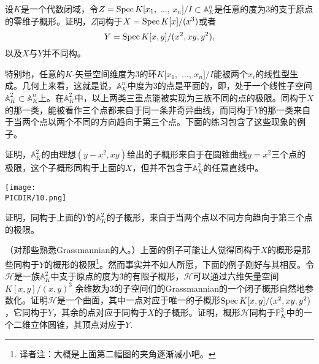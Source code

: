 \begin{exe}
	设$K$是一个代数闭域，令$Z=\operatorname{Spec} K[x_1,$ $\dots$, $x_n]/I\subset \mathbb{A}_K^n$是任意的度为3的支于原点的零维子概形。证明，$Z$同构于$X=\operatorname{Spec} K[x]/(x^3)$或者
	\[
		Y=\operatorname{Spec} K[x,y]/(x^2,xy,y^2),
	\]
	以及$X$与$Y$并不同构。
\end{exe}

特别地，任意的$K$\hyp 矢量空间维度为3的环$K[x_1,$ $\dots$, $x_n]/I$能被两个$x_i$的线性型生成。几何上来看，这就是说，$\mathbb{A}_K^n$中度为3的点是平面的，即，处于一个线性子空间$\mathbb{A}_K^2\subset \mathbb{A}_K^n$上。在$\mathbb{A}_K^2$中，以上两类三重点能被实现为三族不同的点的极限。同构于$X$的那一类，能被看作三个点都来自于同一条非奇异曲线，而同构于$Y$的那一类来自于当两个点以两个不同的方向趋向于第三个点。下面的练习包含了这些现象的例子。

\begin{exe}
	\begin{compactenum}[(i)]
		\item 证明，$\mathbb{A}_K^2$的由理想$(y-x^2,xy)$给出的子概形来自于在圆锥曲线$y=x^2$三个点的极限，这个子概形同构于上面的$X$，但并不包含于$\mathbb{A}_K^2$的任意直线中。

		\begin{center}\texttt{[image: \\PICDIR/10.png]}\end{center}

		\item 证明，同构于上面的$Y$的$\mathbb{A}_K^2$的子概形，来自于当两个点以不同方向趋向于第三个点的极限。
	\end{compactenum}
\end{exe}

\begin{exe} （对那些熟悉Grassmannian的人。）上面的例子可能让人觉得同构于$X$的概形是那些同构于$Y$的概形的极限\footnote{译者注：大概是上面第二幅图的夹角逐渐减小吧。}。然而事实并不如人所愿，下面的例子刚好与其相反。令$\mathscr{H}$是一族$\mathbb{A}_K^2$中支于原点的度为$3$的有限子概形，$\mathscr{H}$可以通过六维矢量空间$K[x,y]/(x,y)^3$ 余维数为$3$的子空间们的Grassmannian的一个闭子概形自然地参数化。证明$\mathscr{H}$是一个曲面，其中一点对应于唯一的子概形$\operatorname{Spec} K[x,y]/(x^2,xy,y^2)$，它同构于$Y$，其余的点对应于同构于$X$的子概形。证明，概形$\mathscr{H}$同构于$\mathbb{P}^3_K$中的一个二维立体圆锥，其顶点对应于$Y$.
\end{exe}

